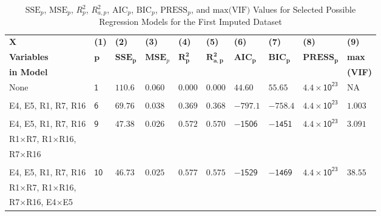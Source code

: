 \begin{table}[ht]
\centering
\begingroup
\caption{$\textrm{SSE}_p$, $\textrm{MSE}_p$, $R_p^2$, $R_{a, p}^2$, $\textrm{AIC}_p$, $\textrm{BIC}_p$, $\textrm{PRESS}_p$, and $\textrm{max(VIF)}$ Values for Selected Possible Regression Models for the First Imputed Dataset} 
\label{tab:model}
\begin{adjustbox}{width=\textwidth}
\begin{tabular}{llllllllll}
\hline
$\mathbf{X}$ & \textbf{(1)} & \textbf{(2)} & \textbf{(3)} & \textbf{(4)} & \textbf{(5)} & \textbf{(6)} & \textbf{(7)} & \textbf{(8)} & \textbf{(9)} \\
\textbf{Variables} & \multirow{2}{*}{$\mathbf{p}$} & \multirow{2}{*}{$\mathbf{SSE_p}$} & \multirow{2}{*}{$\textbf{MSE}_p$} & \multirow{2}{*}{$\mathbf{R_p^2}$} & \multirow{2}{*}{$\mathbf{R_{a, p}^2}$} & \multirow{2}{*}{$\mathbf{AIC_p}$} & \multirow{2}{*}{$\mathbf{BIC_p}$} & \multirow{2}{*}{$\mathbf{PRESS_p}$} & \textbf{max} \\
\textbf{in Model} &  &  &  &  &  &  &  &  & \textbf{(VIF)} \\ 
  \hline
None & $\mathsf{1}$ & $\mathsf{110.6}$ & $\mathsf{0.060}$ & $\mathsf{0.000}$ & $\mathsf{0.000}$ & $\mathsf{44.60}$ & $\mathsf{55.65}$ & $\mathsf{4.4\times10^{23}}$ & NA \\

\\

E4, E5, R1, R7, R16 & $\mathsf{6}$ & $\mathsf{69.76}$ & $\mathsf{0.038}$ & $\mathsf{0.369}$ & $\mathsf{0.368}$ & $\mathsf{-797.1}$ & $\mathsf{-758.4}$ & $\mathsf{4.4\times10^{23}}$ & $\mathsf{1.003}$ \\

\\

E4, E5, R1, R7, R16 & \multirow{3}{*}{$\mathsf{9}$} & \multirow{3}{*}{$\mathsf{47.38}$} & \multirow{3}{*}{$\mathsf{0.026}$} & \multirow{3}{*}{$\mathsf{0.572}$} & \multirow{3}{*}{$\mathsf{0.570}$} & \multirow{3}{*}{$\mathsf{-1506}$} & \multirow{3}{*}{$\mathsf{-1451}$} & \multirow{3}{*}{$\mathsf{4.4\times10^{23}}$} & \multirow{3}{*}{$\mathsf{3.091}$} \\
R1$\times$R7, R1$\times$R16,  &  &  &  &  &  &  &  &  & \\
R7$\times$R16 &  &  &  &  &  &  &  &  & \\

\\

E4, E5, R1, R7, R16 & \multirow{3}{*}{$\mathsf{10}$} & \multirow{3}{*}{$\mathsf{46.73}$} & \multirow{3}{*}{$\mathsf{0.025}$} & \multirow{3}{*}{$\mathsf{0.577}$} & \multirow{3}{*}{$\mathsf{0.575}$} & \multirow{3}{*}{$\mathsf{-1529}$} & \multirow{3}{*}{$\mathsf{-1469}$} & \multirow{3}{*}{$\mathsf{4.4\times10^{23}}$} & \multirow{3}{*}{$\mathsf{38.55}$} \\
R1$\times$R7, R1$\times$R16, &  &  &  &  &  &  &  &  & \\
R7$\times$R16, E4$\times$E5 &  &  &  &  &  &  &  &  & \\


\end{tabular}
\end{adjustbox}
\end{table}
